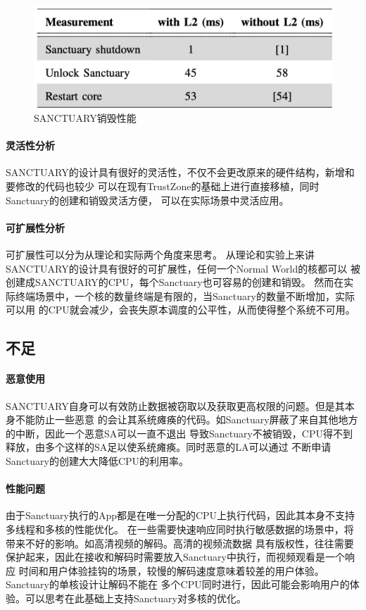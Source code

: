 \begin{figure}
    \centering
    \includegraphics[scale=0.45]{Figures/trustzone/teardown.png}
    \decoRule
    \caption{SANCTUARY销毁性能}
    \label{fig:teardown}
\end{figure}

\paragraph{灵活性分析}
SANCTUARY的设计具有很好的灵活性，不仅不会更改原来的硬件结构，新增和要修改的代码也较少
可以在现有TrustZone的基础上进行直接移植，同时Sanctuary的创建和销毁灵活方便，
可以在实际场景中灵活应用。

\paragraph{可扩展性分析}
可扩展性可以分为从理论和实际两个角度来思考。
从理论和实验上来讲SANCTUARY的设计具有很好的可扩展性，任何一个Normal World的核都可以
被创建成SANCTUARY的CPU，每个Sanctuary也可容易的创建和销毁。
然而在实际终端场景中，一个核的数量终端是有限的，当Sanctuary的数量不断增加，实际可以用
的CPU就会减少，会丧失原本调度的公平性，从而使得整个系统不可用。


\subsection{不足}
\paragraph{恶意使用}
SANCTUARY自身可以有效防止数据被窃取以及获取更高权限的问题。但是其本身不能防止一些恶意
的会让其系统瘫痪的代码。如Sanctuary屏蔽了来自其他地方的中断，因此一个恶意SA可以一直不退出
导致Sanctuary不被销毁，CPU得不到释放，由多个这样的SA足以使系统瘫痪。同时恶意的LA可以通过
不断申请Sanctuary的创建大大降低CPU的利用率。

\paragraph{性能问题}
由于Sanctuary执行的App都是在唯一分配的CPU上执行代码，因此其本身不支持多线程和多核的性能优化。
在一些需要快速响应同时执行敏感数据的场景中，将带来不好的影响。如高清视频的解码。高清的视频流数据
具有版权性，往往需要保护起来，因此在接收和解码时需要放入Sanctuary中执行，而视频观看是一个响应
时间和用户体验挂钩的场景，较慢的解码速度意味着较差的用户体验。Sanctuary的单核设计让解码不能在
多个CPU同时进行，因此可能会影响用户的体验。可以思考在此基础上支持Sanctuary对多核的优化。

